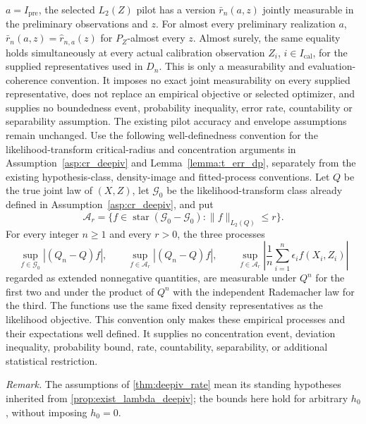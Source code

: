 \begin{lemma}
$a=I_{\mathrm{pre}}$, the selected $L_2(Z)$ pilot has a version $\bar r_n(a,z)$ jointly measurable in the preliminary observations and $z$. For almost every preliminary realization $a$, $\bar r_n(a,z)=\hat r_{n,a}(z)$ for $P_Z$-almost every $z$. Almost surely, the same equality holds simultaneously at every actual calibration observation $Z_i$, $i\in I_{\mathrm{cal}}$, for the supplied representatives used in $D_n$. This is only a measurability and evaluation-coherence convention. It imposes no exact joint measurability on every supplied representative, does not replace an empirical objective or selected optimizer, and supplies no boundedness event, probability inequality, error rate, countability or separability assumption. The existing pilot accuracy and envelope assumptions remain unchanged. Use the following well-definedness convention for the likelihood-transform critical-radius and concentration arguments in Assumption~\ref{asp:cr_deepiv} and Lemma~\ref{lemma:t_err_dp}, separately from the existing hypothesis-class, density-image and fitted-process conventions. Let $Q$ be the true joint law of $(X,Z)$, let $\mathcal G_0$ be the likelihood-transform class already defined in Assumption~\ref{asp:cr_deepiv}, and put \[ \mathcal A_r=\{f\in\operatorname{star}(\mathcal G_0-\mathcal G_0):\|f\|_{L_2(Q)}\leqslant r\}. \] For every integer $n\geqslant1$ and every $r>0$, the three processes \[ \sup_{f\in\mathcal G_0}|(Q_n-Q)f|,\qquad \sup_{f\in\mathcal A_r}|(Q_n-Q)f|,\qquad \sup_{f\in\mathcal A_r}\left|\frac1n\sum_{i=1}^n\epsilon_i f(X_i,Z_i)\right| \] regarded as extended nonnegative quantities, are measurable under $Q^n$ for the first two and under the product of $Q^n$ with the independent Rademacher law for the third. The functions use the same fixed density representatives as the likelihood objective. This convention only makes these empirical processes and their expectations well defined. It supplies no concentration event, deviation inequality, probability bound, rate, countability, separability, or additional statistical restriction.
\end{lemma}

\noindent\textit{Remark.} The assumptions of \cref{thm:deepiv_rate} mean its standing hypotheses inherited from \cref{prop:exist_lambda_deepiv}; the bounds here hold for arbitrary $h_0$, without imposing $h_0=0$.


